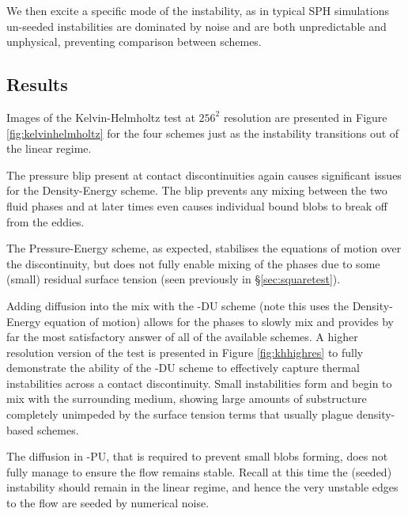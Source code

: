 We then excite a specific mode of the instability, as in typical SPH simulations
un-seeded instabilities are dominated by noise and are both unpredictable and
unphysical, preventing comparison between schemes.

\subsection{Results}

Images of the Kelvin-Helmholtz test at $256^2$ resolution are presented in
Figure \ref{fig:kelvinhelmholtz} for the four schemes just as the
instability transitions out of the linear regime.

The pressure blip present at contact discontinuities again causes significant
issues for the Density-Energy scheme. The blip prevents any mixing between
the two fluid phases and at later times even causes individual bound blobs to
break off from the eddies.

The Pressure-Energy scheme, as expected, stabilises the equations of motion
over the discontinuity, but does not fully enable mixing of the phases due
to some (small) residual surface tension (seen previously in \S \ref{sec:squaretest}).

Adding diffusion into the mix with the \anarchy{}-DU scheme (note this uses the
Density-Energy equation of motion) allows for the phases to slowly mix and
provides by far the most satisfactory answer of all of the available schemes.
A higher resolution version of the test is presented in Figure \ref{fig:khhighres}
to fully demonstrate the ability of the \anarchy{}-DU scheme to effectively
capture thermal instabilities across a contact discontinuity. Small instabilities
form and begin to mix with the surrounding medium, showing large amounts of
substructure completely unimpeded by the surface tension terms that usually plague
density-based schemes.

The diffusion in \anarchy{}-PU, that is required to prevent small blobs
forming, does not fully manage to ensure the flow remains stable. Recall at
this time the (seeded) instability should remain in the linear regime, and
hence the very unstable edges to the flow are seeded by numerical noise.